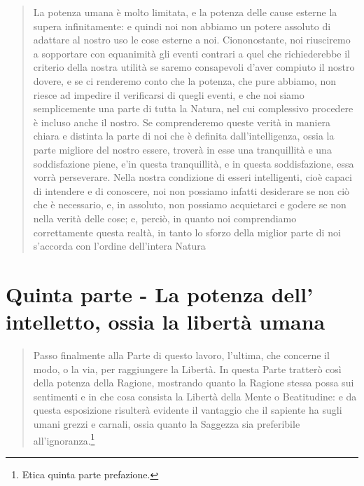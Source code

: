 \begin{quotation}
	\small La potenza umana è molto limitata, e la potenza delle cause esterne la supera infinitamente: e quindi noi non abbiamo un potere assoluto di adattare al nostro uso le cose esterne a noi. Ciononostante, noi riusciremo a sopportare con equanimità gli eventi contrari a
	quel che richiederebbe il criterio della nostra utilità se saremo consapevoli d’aver compiuto
	il nostro dovere, e se ci renderemo conto che la potenza, che pure abbiamo, non riesce ad
	impedire il verificarsi di quegli eventi, e che noi siamo semplicemente una parte di tutta la
	Natura, nel cui complessivo procedere è incluso anche il nostro. Se comprenderemo queste
	verità in maniera chiara e distinta la parte di noi che è definita dall’intelligenza, ossia la
	parte migliore del nostro essere, troverà in esse una tranquillità e una soddisfazione piene,
	e’in questa tranquillità, e in questa soddisfazione, essa vorrà perseverare. Nella nostra condizione di esseri intelligenti, cioè capaci di intendere e di conoscere, noi non possiamo infatti desiderare se non ciò che è necessario, e, in assoluto, non possiamo acquietarci e godere se non nella verità delle cose; e, perciò, in quanto noi comprendiamo correttamente
	questa realtà, in tanto lo sforzo della miglior parte di noi s’accorda con l’ordine dell’intera
	Natura
\end{quotation}
\newpage

\section[La libertà umana]{Quinta parte - La potenza dell'\\intelletto, ossia la libertà umana}

\begin{quotation}
	\small Passo finalmente alla Parte di questo lavoro, l’ultima, che concerne il modo, o la via, per
	raggiungere la Libertà. In questa Parte tratterò così della potenza della Ragione, mostrando quanto la Ragione stessa possa sui sentimenti e in che cosa consista la Libertà della
	Mente o Beatitudine: e da questa esposizione risulterà evidente il vantaggio che il sapiente
	ha sugli umani grezzi e carnali, ossia quanto la Saggezza sia preferibile all’ignoranza.\footnote{Etica quinta parte prefazione.}
\end{quotation}

